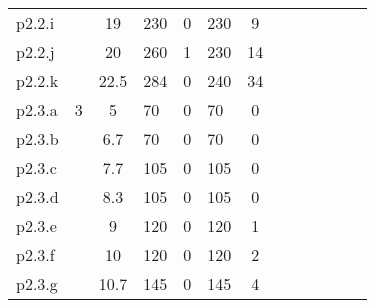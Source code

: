 \begin{table}[H]
\begin{tabularx}{\textwidth}{lXcXlXcXcXcXc}
p2.2.i                                                 &                             & 19                                                 & 230                 & 0                    & 230               & 9                  \\
p2.2.j                                                 &                             & 20                                                 & 260                 & 1                    & 230               & 14                 \\
p2.2.k                                                 &                             & 22.5                                               & 284                 & 0                    & 240               & 34                 \\ \hline
p2.3.a                                                 & 3                           & 5                                                  & 70                  & 0                    & 70                & 0                  \\
p2.3.b                                                 &                             & 6.7                                                & 70                  & 0                    & 70                & 0                  \\
p2.3.c                                                 &                             & 7.7                                                & 105                 & 0                    & 105               & 0                  \\
p2.3.d                                                 &                             & 8.3                                                & 105                 & 0                    & 105               & 0                  \\
p2.3.e                                                 &                             & 9                                                  & 120                 & 0                    & 120               & 1                  \\
p2.3.f                                                 &                             & 10                                                 & 120                 & 0                    & 120               & 2                  \\
p2.3.g                                                 &                             & 10.7                                               & 145                 & 0                    & 145               & 4                  \\

\end{tabularx}
\end{table}
